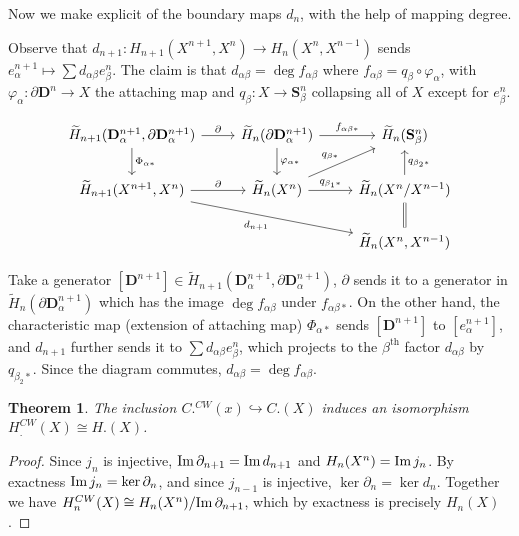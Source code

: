 \documentclass[11pt]{article}
\theoremstyle{definition}
\theoremstyle{plain}
\newtheorem{theorem}{Theorem}[section]
\newcommand{\im}{\textup{Im}\,}
\newcommand{\1}{\mathbf{1}}
\begin{document}
Now we make explicit of the boundary maps $d_n$, with the help of mapping degree.\medbreak

Observe that $d_{n+1}:H_{n+1}(X^{n+1},X^n)\to H_n(X^n,X^{n-1})$ sends $e_\alpha^{n+1}\mapsto\sum d_{\alpha\beta}e^n_\beta$. The claim is that $d_{\alpha\beta}=\deg f_{\alpha\beta}$ where $f_{\alpha\beta}=q_\beta\circ\varphi_\alpha$, with $\varphi_\alpha:\partial\mathbf{D}^n\to X$ the attaching map and $q_\beta:X\to\mathbf{S}^n_\beta$ collapsing all of $X$ except for $e_\beta^n$.

\[\begin{tikzcd}
\widetilde{H}_{n+1}(\mathbf{D}_\alpha^{n+1},\partial\mathbf{D}^{n+1}_\alpha)\arrow{d}{\Phi_{\alpha\ast}}\arrow{r}{\partial}&\widetilde{H}_n(\partial\mathbf{D}_\alpha^{n+1})\arrow{d}{\varphi_{\alpha\ast}}\arrow{r}{f_{\alpha\beta\ast}}&\widetilde{H}_n(\mathbf{S}_\beta^n)\\
\widetilde{H}_{n+1}(X^{n+1},X^n)\arrow[swap]{drr}{d_{n+1}}\arrow{r}{\partial}&\widetilde{H}_n(X^n)\arrow{ur}{q_{\beta\ast}}\arrow{r}{q_{\beta_1\ast}}&\widetilde{H}_n(X^n/X^{n-1})\arrow[swap]{u}{q_{\beta_2\ast}}\\
&&\widetilde{H}_n(X^n,X^{n-1})\arrow[equal]{u}
\end{tikzcd}\]

Take a generator $[\mathbf{D}^{n+1}]\in\widetilde{H}_{n+1}(\mathbf{D}_\alpha^{n+1},\partial\mathbf{D}^{n+1}_\alpha)$, $\partial$ sends it to a generator in $\widetilde{H}_n(\partial\mathbf{D}_\alpha^{n+1})$ which has the image $\deg f_{\alpha\beta}$ under $f_{\alpha\beta\ast}$. On the other hand, the characteristic map (extension of attaching map) $\Phi_{\alpha\ast}$ sends $[\mathbf{D}^{n+1}]$ to $[e_\alpha^{n+1}]$, and $d_{n+1}$ further sends it to $\sum d_{\alpha\beta}e_\beta^n$, which projects to the $\beta^{\mathrm{th}}$ factor $d_{\alpha\beta}$ by $q_{\beta_2\ast}$. Since the diagram commutes, $d_{\alpha\beta}=\deg f_{\alpha\beta}$.

\begin{theorem}
The inclusion $C.^{CW}(x)\hookrightarrow C.(X)$ induces an isomorphism
$H_.^{CW}(X)\cong H.(X)$.
\end{theorem}
\begin{proof}
Since $j_n$ is injective, $\im\partial_{n+1}=\im d_{n+1}$ and $H_n(X^n)=\im j_n$. By exactness $\im j_n=\ker\partial_n$, and since $j_{n-1}$ is injective, $\ker\partial_n=\ker d_n$. Together we have $H_n^{CW}(X)\cong H_n(X^n)/\im\partial_{n+1}$, which by exactness is precisely $H_n(X)$.
\end{proof}
\end{document}
